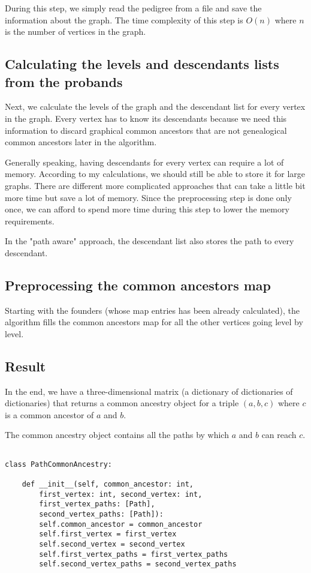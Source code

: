 \documentclass[14pt]{extarticle}
\begin{document}
During this step, we simply read the pedigree from a file and save the information about the graph. The time complexity of this step is $O(n)$ where $n$ is the number of vertices in the graph.

\subsection{Calculating the levels and descendants lists from the probands}

Next, we calculate the levels of the graph and the descendant list for every vertex in the graph. Every vertex has to know its descendants because we need this information to discard graphical common ancestors that are not genealogical common ancestors later in the algorithm.

Generally speaking, having descendants for every vertex can require a lot of memory. According to my calculations, we should still be able to store it for large graphs. There are different more complicated approaches that can take a little bit more time but save a lot of memory. Since the preprocessing step is done only once, we can afford to spend more time during this step to lower the memory requirements.

In the "path aware" approach, the descendant list also stores the path to every descendant.

\subsection{Preprocessing the common ancestors map}

Starting with the founders (whose map entries has been already calculated), the algorithm fills the common ancestors map for all the other vertices going level by level.

\subsection{Result}

In the end, we have a three-dimensional matrix (a dictionary of dictionaries of dictionaries) that returns a common ancestry object for a triple $(a, b, c)$ where $c$ is a common ancestor of $a$ and $b$.

The common ancestry object contains all the paths by which $a$ and $b$ can reach $c$.

\begin{lstlisting}

class PathCommonAncestry:
	
	def __init__(self, common_ancestor: int,
		first_vertex: int, second_vertex: int,
		first_vertex_paths: [Path],
		second_vertex_paths: [Path]):
		self.common_ancestor = common_ancestor
		self.first_vertex = first_vertex
		self.second_vertex = second_vertex
		self.first_vertex_paths = first_vertex_paths
		self.second_vertex_paths = second_vertex_paths
	

\end{lstlisting}
\end{document}
